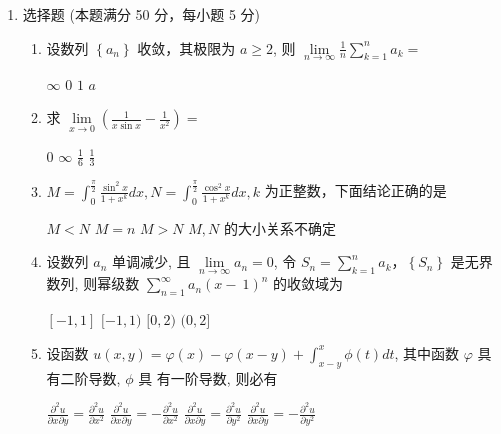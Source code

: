 

\begin{enumerate}
	\item
	选择题 (本题满分 50 分，每小题 5 分)
	\begin{enumerate}
		\item
		设数列 $\left\{a_{n}\right\}$ 收敛，其极限为 $a \geqslant 2$, 则 $\lim\limits _{n \rightarrow \infty} \frac{1}{n} \sum\limits_{k=1}^{n} a_{k}=$  
		
		
\fourchoices
{$\infty$}
{$ 0 $}
{$ 1 $}
{$a$}

\item 
求 $\lim\limits _{x \rightarrow 0}\left(\frac{1}{x \sin x}-\frac{1}{x^{2}}\right)=$  


\fourchoices
{$ 0 $}
{$\infty$}
{$\frac{1}{6}$}
{$\frac{1}{3}$}

\item 
$M=\int_{0}^{\frac{\pi}{2}} \frac{\sin ^{2} x}{1+x^{k}} d x, N=\int_{0}^{\frac{\pi}{2}} \frac{\cos ^{2} x}{1+x^{k}} d x, k$ 为正整数，下面结论正确的是  


\fourchoices
{$M<N$}
{$M=n$}
{$M>N$}
{$M, N$ 的大小关系不确定}

\item 
设数列 $a_{n}$ 单调减少, 且 $\lim\limits _{n \rightarrow \infty} a_{n}=0$, 令 $S_{n}=\sum\limits_{k=1}^{n} a_{k} $，$ \left\{ S_{n} \right\} $ 是无界数列, 则幂级数 $\sum\limits_{n=1}^{\infty} a_{n}(x-~1)^{n}$ 的收敛域为  

\fourchoices
{$[-1,1]$}
{$[-1,1)$}
{$[0,2)$}
{$(0,2]$}

\item 
设函数 $u(x, y)=\varphi(x)-\varphi(x-y)+\int_{x-y}^{x} \phi(t) d t$, 其中函数 $\varphi$ 具有二阶导数, $\phi$ 具 有一阶导数, 则必有  


\fourchoices
{$\frac{\partial^{2} u}{\partial x \partial y}=\frac{\partial^{2} u}{\partial x^{2}}$}
{$\frac{\partial^{2} u}{\partial x \partial y}=-\frac{\partial^{2} u}{\partial x^{2}}$}
{$\frac{\partial^{2} u}{\partial x \partial y}=\frac{\partial^{2} u}{\partial y^{2}}$}
{$\frac{\partial^{2} u}{\partial x \partial y}=-\frac{\partial^{2} u}{\partial y^{2}}$}
	

\end{enumerate}
\end{enumerate}
